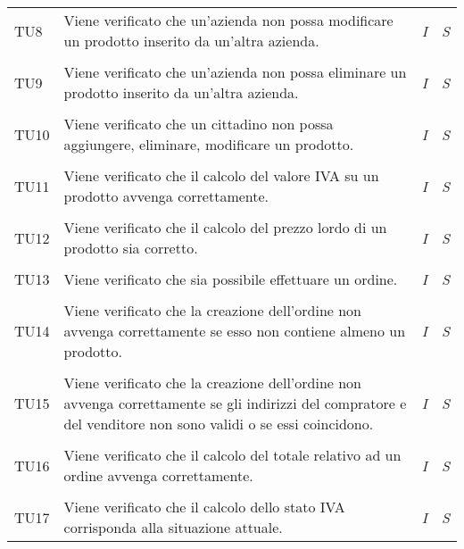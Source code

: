 \begin{longtable}{ >{\centering}p{} >{}p{}
				>{\centering}p{} >{\centering}p{}}
			\tabularnewline
			\hypertarget{TU8}{TU8} &Viene verificato che un'azienda non possa 
			modificare un prodotto inserito da un'altra azienda. & \textit{I} & 
			\textit{S}\\ 
			
			\tabularnewline
			\hypertarget{TU9}{TU9} & Viene verificato che un'azienda non possa 
			eliminare un prodotto inserito da un'altra azienda. & \textit{I} & 
			\textit{S}\\ 
			
			\tabularnewline
			\hypertarget{TU10}{TU10} & Viene verificato che un cittadino non 
			possa aggiungere, eliminare, modificare un prodotto. & \textit{I} & 
			\textit{S}\\
			
			\tabularnewline
			\hypertarget{TU11}{TU11} & Viene verificato che il calcolo del 
			valore IVA su un prodotto avvenga correttamente. & \textit{I} 
			& \textit{S}\\
			
			\tabularnewline
			\hypertarget{TU12}{TU12} & Viene verificato che il calcolo del 
			prezzo lordo di un prodotto sia corretto. & \textit{I} 
			& \textit{S}\\
			
			\tabularnewline
			\hypertarget{TU13}{TU13} & Viene verificato che sia possibile 
			effettuare un ordine. & \textit{I} & \textit{S}\\ 
			
			
			\tabularnewline
			\hypertarget{TU14}{TU14} & Viene verificato che la creazione 
			dell'ordine non avvenga correttamente se esso non contiene almeno 
			un prodotto. & \textit{I} & 
			\textit{S}\\
			
			\tabularnewline
			\hypertarget{TU15}{TU15} & Viene verificato che la creazione 
			dell'ordine non avvenga correttamente se gli indirizzi del 
			compratore e del venditore non sono validi o se essi coincidono. & 
			\textit{I} & 
			\textit{S}\\ 
			
			\tabularnewline
			\hypertarget{TU16}{TU16} & Viene verificato che il calcolo del 
			totale relativo ad un ordine avvenga correttamente. & \textit{I} & 
			\textit{S}\\ 
			
			\tabularnewline
			\hypertarget{TU17}{TU17} & Viene verificato che il calcolo dello 
			stato IVA corrisponda alla situazione attuale. & \textit{I} & 
			\textit{S}\\
			

\end{longtable}
